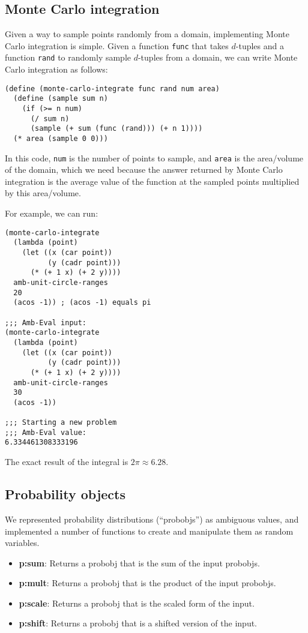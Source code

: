\documentclass{article}
\begin{document}
\subsection{Monte Carlo integration}

Given a way to sample points randomly from a domain, implementing
Monte Carlo integration is simple. Given a function \texttt{func} that
takes $d$-tuples and a function \texttt{rand} to randomly sample
$d$-tuples from a domain, we can write Monte Carlo integration as
follows:
\begin{lstlisting}
(define (monte-carlo-integrate func rand num area)
  (define (sample sum n)
    (if (>= n num)
      (/ sum n)
      (sample (+ sum (func (rand))) (+ n 1))))
  (* area (sample 0 0)))
\end{lstlisting}
In this code, \texttt{num} is the number of points to sample, and
\texttt{area} is the area/volume of the domain, which we need because
the answer returned by Monte Carlo integration is the average value of
the function at the sampled points multiplied by this area/volume.

For example, we can run:
\begin{lstlisting}
(monte-carlo-integrate
  (lambda (point)
    (let ((x (car point))
          (y (cadr point)))
      (* (+ 1 x) (+ 2 y))))
  amb-unit-circle-ranges
  20
  (acos -1)) ; (acos -1) equals pi

;;; Amb-Eval input:
(monte-carlo-integrate
  (lambda (point)
    (let ((x (car point))
          (y (cadr point)))
      (* (+ 1 x) (+ 2 y))))
  amb-unit-circle-ranges
  30
  (acos -1))

;;; Starting a new problem
;;; Amb-Eval value:
6.334461308333196
\end{lstlisting}
The exact result of the integral is $2\pi \approx 6.28$.

\subsection{Probability objects}

We represented probability distributions (``probobjs'') as ambiguous
values, and implemented a number of functions to create and manipulate
them as random variables.
\begin{itemize}
\item \textbf{p:sum}: Returns a {probobj} that is the sum of the input
  {probobj}s.
\item \textbf{p:mult}: Returns a {probobj} that is the product of the
  input {probobj}s.
\item \textbf{p:scale}: Returns a {probobj} that is the scaled form of
  the input.
\item \textbf{p:shift}: Returns a {probobj} that is a shifted version
  of the input.
\end{itemize}
\end{document}
